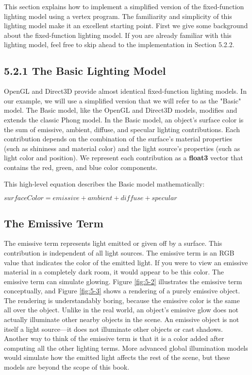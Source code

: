 \documentclass[../main.tex]{subfiles}
\begin{document}
This section explains how to implement a simplified version of the fixed-function lighting model using a vertex program. The familiarity and simplicity of this lighting model make it an excellent starting point. First we give some background about the fixed-function lighting model. If you are already familiar with this lighting model, feel free to skip ahead to the implementation in Section 5.2.2.

\subsection{5.2.1 The Basic Lighting Model}

OpenGL and Direct3D provide almost identical fixed-function lighting models. In our example, we will use a simplified version that we will refer to as the "Basic" model. The Basic model, like the OpenGL and Direct3D models, modifies and extends the classic Phong model. In the Basic model, an object's surface color is the sum of emissive, ambient, diffuse, and specular lighting contributions. Each contribution depends on the combination of the surface's material properties (such as shininess and material color) and the light source's properties (such as light color and position). We represent each contribution as a \textbf{float3} vector that contains the red, green, and blue color components.

This high-level equation describes the Basic model mathematically:

$surfaceColor = emissive + ambient + diffuse + specular$

\subsection*{The Emissive Term}

The emissive term represents light emitted or given off by a surface. This contribution is independent of all light sources. The emissive term is an RGB value that indicates the color of the emitted light. If you were to view an emissive material in a completely dark room, it would appear to be this color. The emissive term can simulate glowing. Figure \ref{fig:5-2} illustrates the emissive term conceptually, and Figure \ref{fig:5-3} shows a rendering of a purely emissive object. The rendering is understandably boring, because the emissive color is the same all over the object. Unlike in the real world, an object's emissive glow does not actually illuminate other nearby objects in the scene. An emissive object is not itself a light source—it does not illuminate other objects or cast shadows. Another way to think of the emissive term is that it is a color added after computing all the other lighting terms. More advanced global illumination models would simulate how the emitted light affects the rest of the scene, but these models are beyond the scope of this book.
\end{document}
